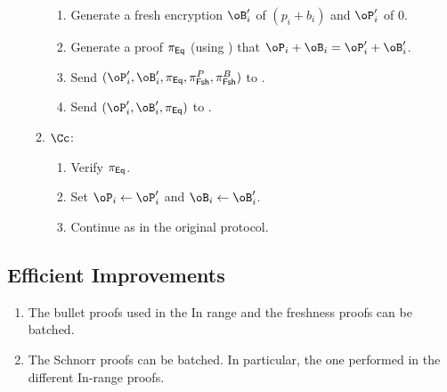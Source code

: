 \begin{enumerate}
\begin{enumerate}
\begin{enumerate}
			
			\item Generate a fresh  encryption $\oB_i'$ of $(p_i +b_i )$ and $\oP_i'$ of $0$.
			
			\item Generate a proof $\pi_{\sf Eq}$ (\ie using \pZK{\rEq})   that $\oP_i+\oB_i = \oP_i'+ \oB_i'$.
			
			
			
			\item Send $(\oP_i',\oB_i',\pi_\Eqs,\pi^P_\FshS,\pi^B_\FshS)$ to \Cc.
			\item Send $(\oP_i',\oB_i',\pi_\Eqs)$ to \Cc.
		
		
		\end{enumerate}
		
		\item $\Cc$:
			\begin{enumerate}
				
					\item Verify $\pi_{\sf Eq}$.
				
				\item Set $\oP_i  \asn \oP_i'$  and $\oB_i  \asn \oB_i'$.
				
				\item Continue as in the original protocol.
			\end{enumerate}
		
	\end{enumerate}
\end{enumerate}


\subsection{Efficient Improvements}\label{sec:ChanksEg:EfficientImp}

\begin{enumerate}
	\item The bullet proofs used  in the In range and the freshness proofs can be batched. 
	
	\item The Schnorr proofs can be batched. In particular, the one performed in the different In-range proofs.  
\end{enumerate}



\newcommand{\tdKg}{\MathAlgX{TshGen}}

